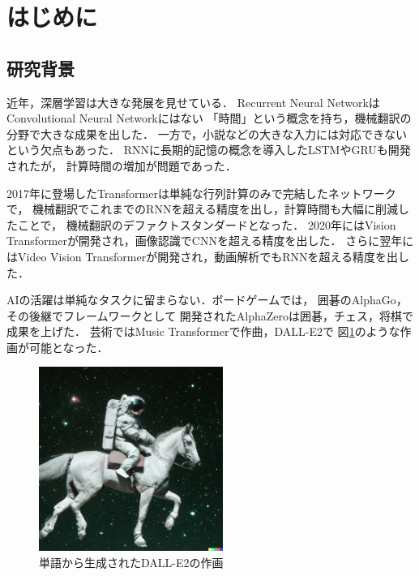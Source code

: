 \section{はじめに}

\subsection{研究背景}
近年，深層学習は大きな発展を見せている．
Recurrent Neural Network\cite{rnn}はConvolutional Neural Network\cite{cnn}にはない
「時間」という概念を持ち，機械翻訳の分野で大きな成果を出した．
一方で，小説などの大きな入力には対応できないという欠点もあった．
RNNに長期的記憶の概念を導入したLSTM\cite{lstm}やGRU\cite{gru}も開発されたが，
計算時間の増加が問題であった．

2017年に登場したTransformer\cite{transformer}は単純な行列計算のみで完結したネットワークで，
機械翻訳でこれまでのRNNを超える精度を出し，計算時間も大幅に削減したことで，
機械翻訳のデファクトスタンダードとなった．
2020年にはVision Transformer\cite{vit}が開発され，画像認識でCNNを超える精度を出した．
さらに翌年にはVideo Vision Transformer\cite{vivit}が開発され，動画解析でもRNNを超える精度を出した．

AIの活躍は単純なタスクに留まらない．ボードゲームでは，
囲碁のAlphaGo\cite{alphago}，その後継でフレームワークとして
開発されたAlphaZero\cite{alphazero}は囲碁，チェス，将棋で成果を上げた．
芸術ではMusic Transformer\cite{mut}で作曲，DALL-E2\cite{dalle2}で
図\ref{astronaut}のような作画が可能となった．

\begin{figure}[b]
  \begin{center}
    \includegraphics[width=60mm]{images/quote/astronaut.jpg}
  \end{center}
  \caption{単語から生成されたDALL-E2の作画\cite{demo}}
  \label{astronaut}
\end{figure}
\clearpage

